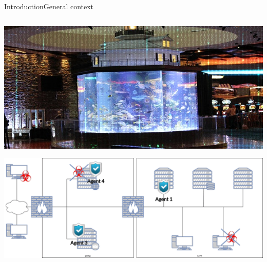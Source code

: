 \begin{frame}{Introduction}{General context}
\begin{columns}
        \begin{column}{0.4\textwidth}
            \includegraphics[width=\linewidth]{figures/casino.jpg}

            \vspace{0.8cm}

            \includegraphics[width=\linewidth]{figures/company_network.png}
        \end{column}

    \end{columns}

\end{frame}

